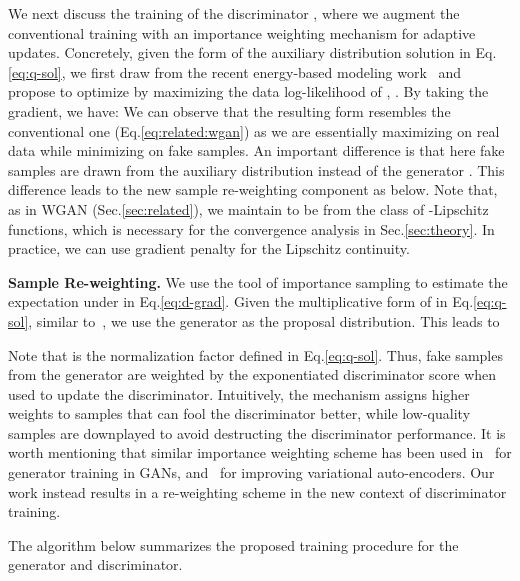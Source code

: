 \documentclass{article}
\newcommand{\0}{\bm{0}}
\begin{document}
We next discuss the training of the discriminator , where we augment the conventional training with an importance weighting mechanism for adaptive updates. 
Concretely, given the form of the auxiliary distribution solution  in Eq.\eqref{eq:q-sol}, we first draw from the recent energy-based modeling work~\cite{kim2016deep,hu2018deep} and propose to optimize  by maximizing the data log-likelihood of , . By taking the gradient, we have: 
We can observe that the resulting form resembles the conventional one (Eq.\ref{eq:related:wgan}) as we are essentially maximizing  on real data while minimizing  on fake samples. An important difference is that here fake samples are drawn from the auxiliary distribution  instead of the generator . This  difference leads to the new sample re-weighting component as below. Note that, as in WGAN (Sec.\ref{sec:related}), we maintain  to be from the class of -Lipschitz functions, which is necessary for the convergence analysis in Sec.\ref{sec:theory}. In practice, we can use gradient penalty \cite{wgangp,wwgan} for the Lipschitz continuity.


\textbf{Sample Re-weighting.}  
We use the tool of importance sampling to estimate the expectation under  in Eq.\eqref{eq:d-grad}. Given the multiplicative form of  in Eq.\eqref{eq:q-sol}, similar to~\cite{abdolmaleki2018maximum,hu2018deep,deng2020residual}, we use the generator  as the proposal distribution. This leads to 

Note that  is the normalization factor defined in Eq.\eqref{eq:q-sol}. Thus, fake samples from the generator are weighted by the exponentiated discriminator score when used to update the discriminator. Intuitively, the mechanism assigns higher weights to samples that can fool the discriminator better, while low-quality samples are downplayed to avoid destructing the discriminator performance. It is worth mentioning that similar importance weighting scheme has been used in~\cite{hu2017unifying,MLGAN} for generator training in GANs, and~\cite{burda2015importance} for improving variational auto-encoders. Our work instead results in a re-weighting scheme in the new context of discriminator training.

The algorithm below summarizes the proposed training procedure for the generator and discriminator.
\end{document}
